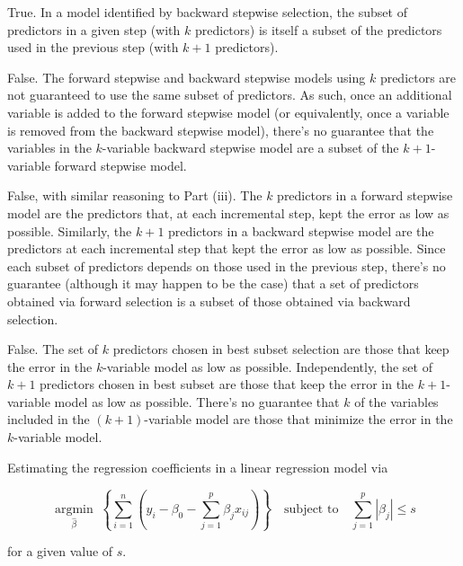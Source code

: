 \documentclass[11pt]{exam} %
\newcommand{\argmin}[1]{\underset{#1}{\operatorname{argmin}}\;}
\begin{document}
\begin{questions}
\begin{parts}
\begin{subparts}
\subpart True. In a model identified by backward stepwise selection, the subset of predictors in a given step (with $k$ predictors) is itself a subset of the predictors used in the previous step (with $k+1$ predictors).

\subpart False. The forward stepwise and backward stepwise models using $k$ predictors are not guaranteed to use the same subset of predictors. As such, once an additional variable is added to the forward stepwise model (or equivalently, once a variable is removed from the backward stepwise model), there's no guarantee that the variables in the $k$-variable backward stepwise model are a subset of the $k+1$-variable forward stepwise model.

\subpart False, with similar reasoning to Part (iii). The $k$ predictors in a forward stepwise model are the predictors that, at each incremental step, kept the error as low as possible. Similarly, the $k+1$ predictors in a backward stepwise model are the predictors at each incremental step that kept the error as low as possible. Since each subset of predictors depends on those used in the previous step, there's no guarantee (although it may happen to be the case) that a set of predictors obtained via forward selection is a subset of those obtained via backward selection.

\subpart False. The set of $k$ predictors chosen in best subset selection are those that keep the error in the $k$-variable model as low as possible. Independently, the set of $k+1$ predictors chosen in best subset are those that keep the error in the $k+1$-variable model as low as possible. There's no guarantee that $k$ of the variables included in the $(k+1)$-variable model are those that minimize the error in the $k$-variable model.


\end{subparts}
 

\end{parts}




Estimating the regression coefficients in a linear regression model via

$$\argmin{\hat{\beta}}\left\{ \sum_{i=1}^{n} \left(    y_i - \beta_0 - \sum_{j=1}^p \beta_j x_{ij} \right) \right\} \quad \text{subject to} \quad \sum_{j=1}^p \left|{\beta_j}\right| \leq s$$

for a given value of $s$.


\end{questions}
\end{document}
